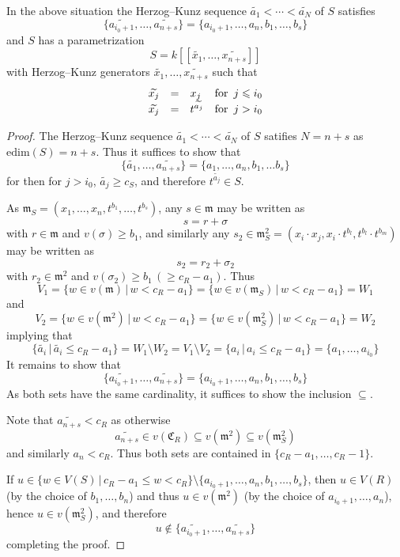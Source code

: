 \documentclass[10pt,a4paper]{amsart}
\renewcommand{\geq}{\geqslant}
\renewcommand{\leq}{\leqslant}
\begin{document}
\begin{proposition}\label{prop:MM_4_4_1}
In the above situation the Herzog--Kunz sequence 
$\widetilde{a_1} < \cdots < \widetilde{a_N}$ of $S$ 
satisfies 
	$$ \{\widetilde{a_{i_0+1}},\ldots,\widetilde{a_{n+s}}\} 
    = \{a_{i_0+1}, \ldots, a_{n}, b_1,\ldots, b_s \} $$
and $S$ has a parametrization 
	$$ S = k[[\widetilde{x_1},\ldots,\widetilde{x_{n+s}}]] $$
with Herzog--Kunz generators $\widetilde{x_1},\ldots,
\widetilde{x_{n+s}}$  such that 
	$$ \begin{array} {l c l l}
	\widetilde{x_j} & = & x_j & \text{for }\, j \leq i_0 \\
	\widetilde{x_j} & = & t^{\widetilde{a_j}} & \text{for } 
    \, j > i_0 \\
	\end{array} $$  
\end{proposition}

\begin{proof}
The Herzog--Kunz sequence $\widetilde{a_1} < \cdots < 
\widetilde{a_N}$ of $S$ satifies $N = n+s$ as 
$\mathrm{edim}(S) = n+s$. Thus it suffices to show that 
	$$ \{ \widetilde{a_1} ,\ldots ,\widetilde{a_{n+s}}\} = 
	\{a_1, \ldots, a_n, b_1, \ldots b_s\} $$
for then for $j > i_0$, $\widetilde{a_j} \geq c_S$, and 
therefore $t^{\widetilde{a_j}} \in S$.

As $\mathfrak m_S = (x_1, \ldots, x_n, t^{b_1}, \ldots, 
t^{b_s})$, any $s \in \mathfrak m$ may be written as 
	$$ s = r + \sigma $$
with $r \in \mathfrak m$ and $v(\sigma) \geq b_1 $, and 
similarly any $s_2 \in \mathfrak m_S^2 = (x_i \cdot x_j, 
x_i \cdot t^{b_l}, t^{b_l} \cdot t^{b_m})$ 
may be written as 
	$$ s_2 = r_2 + \sigma_2 $$
with $r_2 \in \mathfrak m^2$ and $v(\sigma_2) \geq b_1 \,
(\geq c_R -a_1)$. Thus 
	$$ V_1 = \{w\in v(\mathfrak m)\,\vert\,w < c_R -a_1\} = 
	\{w\in v(\mathfrak m_S)\,\vert \, w < c_R -a_1\} = W_1 $$
and 
	$$ V_2=\{ w\in v(\mathfrak m^2)\,\vert \,w<c_R-a_1\} = 
	\{w \in v(\mathfrak m^2_S)\,\vert \,w < c_R -a_1\}=W_2 $$
implying that 
	$$ \{ \widetilde{a_i} \, \vert \, \widetilde{a_i} 
    \leq c_R-a_1 \} = W_1 \setminus W_2
	= V_1 \setminus V_2 =\{a_i\, \vert \,a_i\leq c_R-a_1 \} 
    = \{a_1, \ldots, a_{i_0} \} $$
It remains to show that 
	$$\{\widetilde{a_{i_0+1}},\ldots,\widetilde{a_{n+s}}\}= 
	\{ a_{i_0+1}, \ldots, a_n, b_1, \ldots, b_s \} $$
As both sets have the same cardinality, it suffices to show 
the inclusion $\subseteq$. 

Note that $\widetilde{a_{n+s}} < c_R$ as otherwise 
	$$ \widetilde{a_{n+s}} \in v(\mathfrak C_R) \subseteq 
    v(\mathfrak m^2) \subseteq v(\mathfrak m_S^2) $$
and similarly $a_n < c_R$. Thus both sets are contained in 
$\{c_R-a_1, \ldots, c_R-1\}$. 

If $u \in \{w \in V(S) \, \vert \, c_R-a_1 \leq w < c_R \} 
\setminus \{ a_{i_0+1}, \ldots, a_n, b_1, \ldots, b_s\}$, 
then $u \in V(R)$ (by the choice of $b_1, \ldots, b_n$) 
and thus 
$u \in v(\mathfrak m^2)$ (by the choice of $a_{i_0+1}, 
\ldots, a_n$), hence $u \in v(\mathfrak m_S^2)$, 
and therefore 
	$$ u \notin \{ \widetilde{a_{i_0+1}}, \ldots, 
    \widetilde{a_{n+s}} \} $$
completing the proof. 
 
\end{proof}
\end{document}
